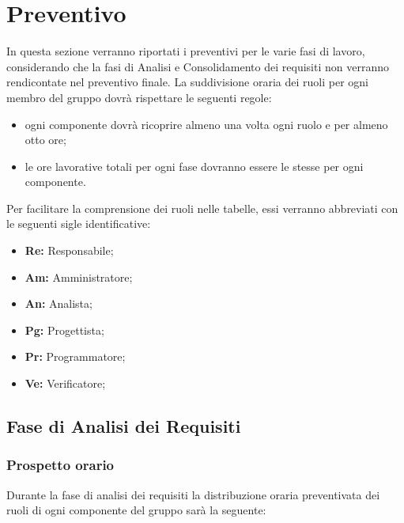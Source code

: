 \section{Preventivo}
	In questa sezione verranno riportati i preventivi per le varie fasi di lavoro, considerando che la fasi di Analisi e Consolidamento dei requisiti non verranno rendicontate nel preventivo finale. 
	La suddivisione oraria dei ruoli per ogni membro del gruppo dovrà rispettare le seguenti regole:
		\begin{itemize}
		\item ogni componente dovrà ricoprire almeno una volta ogni ruolo e per almeno otto ore;
		\item le ore lavorative totali per ogni fase dovranno essere le stesse per ogni componente.
	\end{itemize}
	 Per facilitare la comprensione dei ruoli nelle tabelle, essi verranno abbreviati con le seguenti sigle identificative:
			\begin{itemize}
			\item\textbf{Re:} Responsabile;
			\item\textbf{Am:} Amministratore;
			\item\textbf{An:} Analista;
			\item\textbf{Pg:} Progettista;
			\item\textbf{Pr:} Programmatore;
			\item\textbf{Ve:} Verificatore;
		\end{itemize}
	\subsection{Fase di Analisi dei Requisiti}
		\subsubsection{Prospetto orario}
			Durante la fase di analisi dei requisiti la distribuzione oraria preventivata dei ruoli di ogni componente del gruppo sarà la seguente:
			
